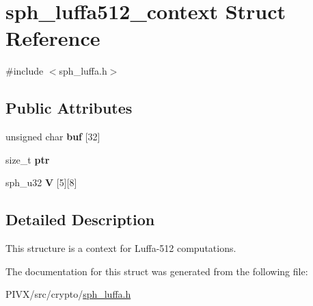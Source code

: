 \hypertarget{structsph__luffa512__context}{}\section{sph\+\_\+luffa512\+\_\+context Struct Reference}
\label{structsph__luffa512__context}


{\ttfamily \#include $<$sph\+\_\+luffa.\+h$>$}

\subsection*{Public Attributes}
\begin{DoxyCompactItemize}
\item 
\mbox{\label{structsph__luffa512__context_a5af7f6fd6cb6e0986911049bff8e4c72}} 
unsigned char {\bfseries buf} \mbox{[}32\mbox{]}
\item 
\mbox{\label{structsph__luffa512__context_a27838c5d89d8247efd7e3fcf9635906b}} 
size\+\_\+t {\bfseries ptr}
\item 
\mbox{\label{structsph__luffa512__context_a458e771cc64352f102a52bb59fc66dc4}} 
sph\+\_\+u32 {\bfseries V} \mbox{[}5\mbox{]}\mbox{[}8\mbox{]}
\end{DoxyCompactItemize}


\subsection{Detailed Description}
This structure is a context for Luffa-\/512 computations. 

The documentation for this struct was generated from the following file\+:\begin{DoxyCompactItemize}
\item 
P\+I\+V\+X/src/crypto/\mbox{\hyperlink{sph__luffa_8h}{sph\+\_\+luffa.\+h}}\end{DoxyCompactItemize}
